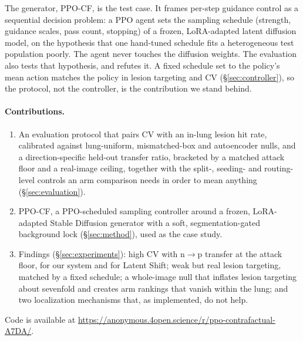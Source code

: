 The generator, PPO-CF, is the test case. It frames per-step guidance control as a sequential decision problem: a PPO agent sets the sampling schedule (strength, guidance scales, pass count, stopping) of a frozen, LoRA-adapted latent diffusion model, on the hypothesis that one hand-tuned schedule fits a heterogeneous test population poorly. The agent never touches the diffusion weights. The evaluation also tests that hypothesis, and refutes it. A fixed schedule set to the policy's mean action matches the policy in lesion targeting and CV (\S\ref{sec:controller}), so the protocol, not the controller, is the contribution we stand behind.

\paragraph{Contributions.}
\begin{enumerate}
    \item An evaluation protocol that pairs CV with an in-lung lesion hit rate, calibrated against lung-uniform, mismatched-box and autoencoder nulls, and a direction-specific held-out transfer ratio, bracketed by a matched attack floor and a real-image ceiling, together with the split-, seeding- and routing-level controls an arm comparison needs in order to mean anything (\S\ref{sec:evaluation}).
    \item PPO-CF, a PPO-scheduled sampling controller around a frozen, LoRA-adapted Stable Diffusion generator with a soft, segmentation-gated background lock (\S\ref{sec:method}), used as the case study.
    \item Findings (\S\ref{sec:experiments}): high CV with n$\to$p transfer at the attack floor, for our system and for Latent Shift; weak but real lesion targeting, matched by a fixed schedule; a whole-image null that inflates lesion targeting about sevenfold and creates arm rankings that vanish within the lung; and two localization mechanisms that, as implemented, do not help.
\end{enumerate}

Code is available at \url{https://anonymous.4open.science/r/ppo-contrafactual-A7DA/}.
